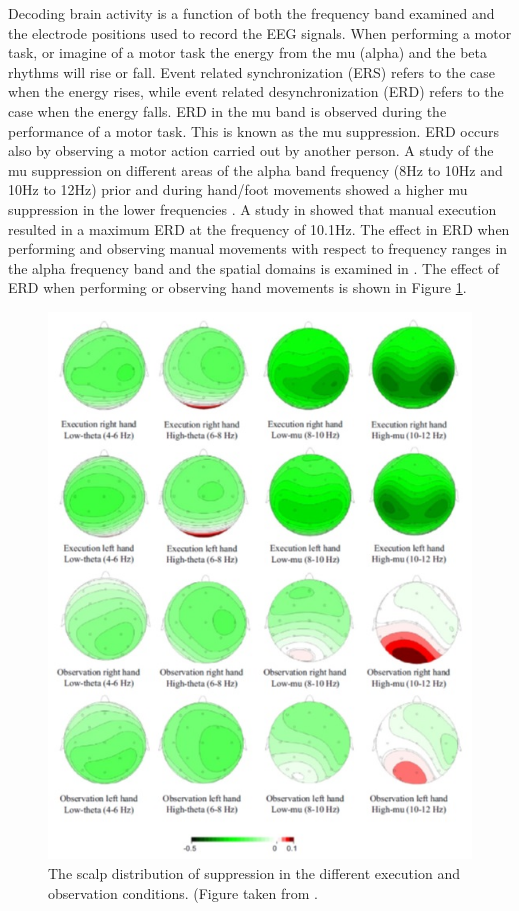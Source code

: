 Decoding brain activity is a function of both the frequency band examined and the electrode positions used to record the EEG signals. When performing a motor task, or imagine of a motor task the energy from the mu (alpha) and the beta rhythms will rise or fall. Event related synchronization (ERS) refers to the case when the energy rises, while event related desynchronization (ERD) refers to the case when the energy falls. ERD in the mu band is observed during the performance of a motor task. This is known as the mu suppression. ERD occurs also by observing a motor action carried out by another person. A study of the mu suppression on different areas of the alpha band frequency (8Hz to 10Hz and 10Hz to 12Hz) prior and during hand/foot movements showed a higher mu suppression in the lower frequencies \citep{Pfurtscheller2000}.  A study in \citep{Khulman1978} showed that manual execution resulted in a maximum ERD at the frequency of 10.1Hz. The effect in ERD when performing and observing manual movements with respect to frequency ranges in the alpha frequency band and the spatial domains is examined in \citep{Frenkel2013}. The effect of ERD when performing or observing hand movements is shown in Figure \ref{Scalp}. 


\begin{figure}
	\centering
	\includegraphics[width=\linewidth]{Figures/ScalpSignals.jpg} %
	\caption{The scalp distribution of suppression in the different execution and observation conditions. (Figure taken from \citep{Frenkel2013}.} 
	\label{Scalp} %
\end{figure}


